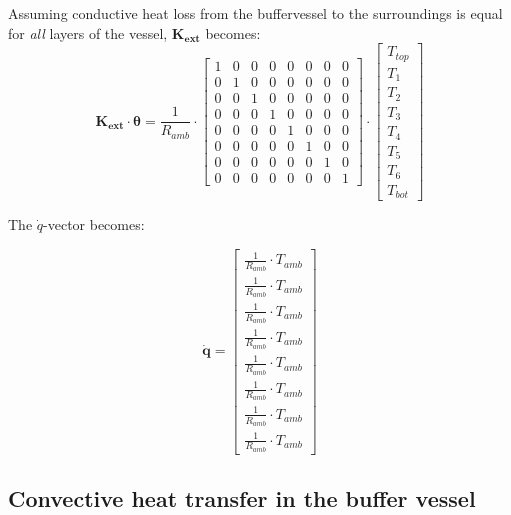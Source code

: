 \begin{scriptsize}
	Assuming conductive heat loss from the buffervessel to the surroundings is equal for \emph{all} layers of the vessel, $\mathbf{K_{ext}}$ becomes:
	\begin{equation}
		\mathbf{K_{ext}} \cdot \boldsymbol{\theta} = \frac{1}{R_{amb}} \cdot
		\begin{bmatrix}
			1 & 0 & 0 & 0 & 0 & 0 & 0 & 0 \\
			0 &  1 & 0 & 0 & 0 & 0 & 0 & 0 \\
			0 & 0 &  1 & 0 & 0 & 0 & 0 & 0 \\
			0 & 0  & 0 &  1 & 0 & 0 & 0 & 0 \\
			0 & 0 & 0 & 0 &  1 & 0 & 0 & 0 \\
			0 & 0 & 0 & 0 & 0 &  1 & 0 & 0 \\
			0 & 0 & 0 & 0 & 0 & 0 &  1 & 0 \\
			0 & 0 & 0 & 0 & 0 & 0 & 0 & 1
		\end{bmatrix}
		\cdot
		\begin{bmatrix}
			T_{top} \\
			T_{1} \\
			T_{2} \\
			T_{3} \\
			T_{4} \\
			T_{5} \\
			T_{6} \\
			T_{bot}
		\end{bmatrix}
	\end{equation}
	
	The $\dot{q}$-vector becomes:
	
	\begin{equation}
		\mathbf{\dot{q}} = 
		\begin{bmatrix}
			\frac{1}{R_{amb}} \cdot T_{amb} \\
			\frac{1}{R_{amb}} \cdot T_{amb} \\
			\frac{1}{R_{amb}} \cdot T_{amb} \\
			\frac{1}{R_{amb}} \cdot T_{amb} \\
			\frac{1}{R_{amb}} \cdot T_{amb} \\
			\frac{1}{R_{amb}} \cdot T_{amb} \\
			\frac{1}{R_{amb}} \cdot T_{amb} \\
			\frac{1}{R_{amb}} \cdot T_{amb}  
		\end{bmatrix}
	\end{equation}
	
	
	\subsection{Convective heat transfer in the buffer vessel}
	

\end{scriptsize}
